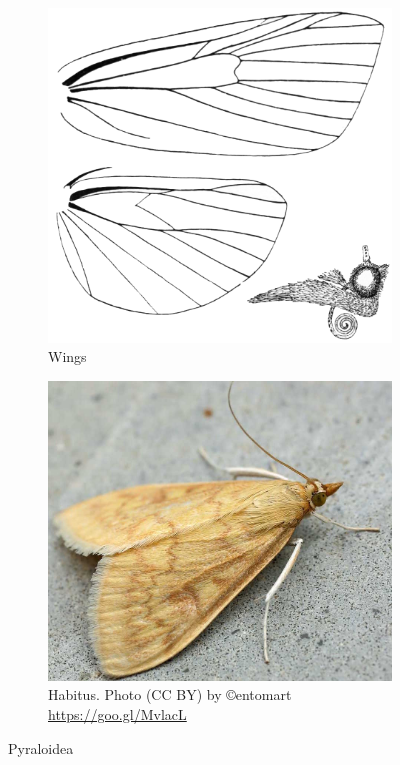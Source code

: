 \documentclass[letterpaper, 11pt]{article}
\begin{document}
\begin{figure}[ht!]
    \centering
    \begin{subfigure}[ht!]{0.38\textwidth}
        \includegraphics[width=\textwidth]{PyralidWings}
        \caption{Wings \citep[composed from][Plate C]{bhl73500}}%
        \label{fig:pyraloid1}
    \end{subfigure}
    \hfill %
    \begin{subfigure}[ht!]{0.42\textwidth}
        \includegraphics[width=\textwidth]{PyralidHabitus}
        \caption{Habitus. Photo (CC BY) by \copyright{}entomart \url{https://goo.gl/MvlacL}}
        \label{fig:pyraloid2}
    \end{subfigure}
    \caption{Pyraloidea}\label{fig:pyraloids}
\end{figure}
\end{document}
